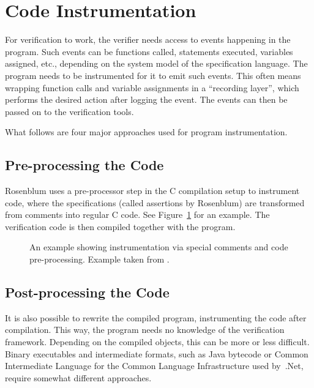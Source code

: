 \documentclass[a4paper,11pt]{kth-mag}
\begin{document}
\section{Code Instrumentation} \label{section-instrumentation}

For verification to work, the verifier needs access to events happening in the
program. Such events can be functions called, statements executed, variables
assigned, etc., depending on the system model of the specification language.
The program needs to be instrumented for it to emit such events. This often
means wrapping function calls and variable assignments in a ``recording
layer'', which performs the desired action after logging the event. The events
can then be passed on to the verification tools.

What follows are four major approaches used for program instrumentation.


\subsection{Pre-processing the Code}

Rosenblum \cite{rosenblum95practicalassertions} uses a pre-processor step in
the C compilation setup to instrument code, where the specifications (called
assertions by Rosenblum) are transformed from comments into regular C code. See
Figure~\ref{figure-pre-processing-comments-example} for an example. The
verification code is then compiled together with the program.

\begin{figure}[h!]
	\begin{center}
	\begin{minipage}{0.7\textwidth}
    \lstset{language=C}
		
	\end{minipage}
	\end{center}
  \caption{An example showing instrumentation via special comments and code
    pre-processing. Example taken from \cite{rosenblum95practicalassertions}.}
	\label{figure-pre-processing-comments-example}
\end{figure}


\subsection{Post-processing the Code}

It is also possible to rewrite the compiled program, instrumenting the code
after compilation. This way, the program needs no knowledge of the verification
framework. Depending on the compiled objects, this can be more or less
difficult. Binary executables and intermediate formats, such as Java bytecode
or Common Intermediate Language for the Common Language Infrastructure used
by~.Net, require somewhat different approaches.
\end{document}
